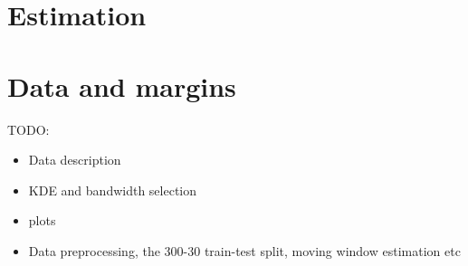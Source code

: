 \documentclass[11pt,a4paper,english]{article}
\begin{document}
%
%




\section{Estimation}\label{sec:estimation}


\section{Data and margins}\label{sec:data-and-margins}
TODO:
\begin{itemize}
    \item Data description
    \item KDE and bandwidth selection
    \item plots
    \item Data preprocessing, the 300-30 train-test split, moving window estimation etc
\end{itemize}



\newpage

\end{document}
